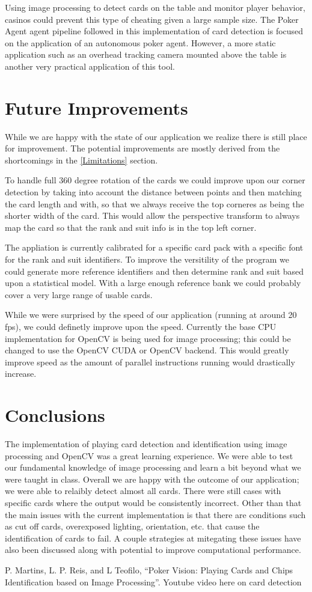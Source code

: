 \documentclass[conference]{IEEEtran}
\begin{document}
Using image processing to detect cards on the table and monitor player behavior, casinos could
prevent this type of cheating given a large sample size. The Poker Agent agent pipeline followed in
this implementation of card detection is focused on the application of an autonomous poker agent.
However, a more static application such as an overhead tracking camera mounted above the table is
another very practical application of this tool.

\section{Future Improvements}
While we are happy with the state of our application we realize there is still place for
improvement. The potential improvements are mostly derived from the shortcomings in the
\ref{Limitations} section.

To handle full 360 degree rotation of the cards we could improve upon our corner detection by taking
into account the distance between points and then matching the card length and with, so that we
always receive the top corneres as being the shorter width of the card. This would allow the
perspective transform to always map the card so that the rank and suit info is in the top left
corner.

The appliation is currently calibrated for a specific card pack with a specific font for the rank
and suit identifiers. To improve the versitility of the program we could generate more reference
identifiers and then determine rank and suit based upon a statistical model. With a large enough
reference bank we could probably cover a very large range of usable cards.

While we were surprised by the speed of our application (running at around 20 fps), we could
definetly improve upon the speed. Currently the base CPU implementation for OpenCV is being used for
image processing; this could be changed to use the OpenCV CUDA or OpenCV backend. This would greatly
improve speed as the amount of parallel instructions running would drastically increase.

\section{Conclusions}
The implementation of playing card detection and identification using image processing and OpenCV
was a great learning experience. We were able to test our fundamental knowledge of image processing
and learn a bit beyond what we were taught in class. Overall we are happy with the outcome of our
application; we were able to relaibly detect almost all cards. There were still cases with specific
cards where the output would be consistently incorrect. Other than that the main issues with the
current implementation is that there are conditions such as cut off cards, overexposed lighting,
orientation, etc. that cause the identification of cards to fail. A couple strategies at mitegating
these issues have also been discussed along with potential to improve computational performance.

\begin{thebibliography}{00}
 P. Martins, L. P. Reis, and L Teofilo, ``Poker Vision: Playing Cards and
    Chips Identification based on Image Processing''.
 Youtube video here on card detection
\end{thebibliography}
\vspace{12pt}
\end{document}
